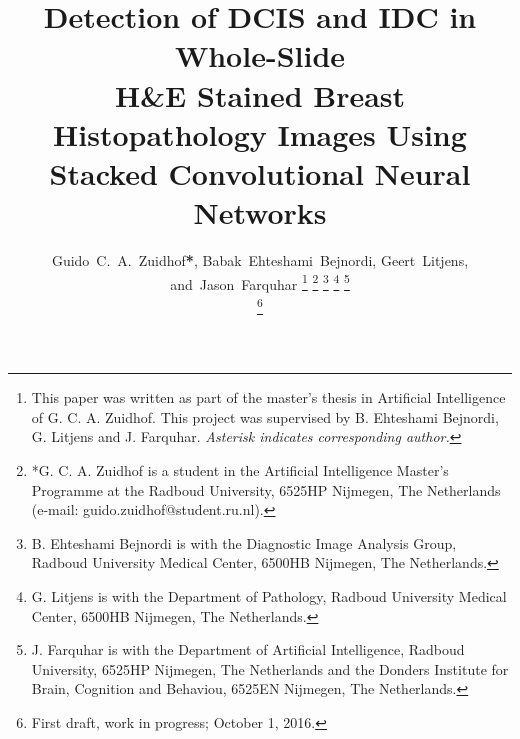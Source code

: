 \documentclass[journal]{IEEEtran}
\begin{document}
%
\title{Detection of DCIS and IDC in Whole-Slide\\ H\&E Stained Breast Histopathology Images Using Stacked Convolutional Neural Networks}
%
%
%

\author{Guido~C.~A.~Zuidhof\textbf{*},
        Babak~Ehteshami~Bejnordi,
        Geert~Litjens,
        and~Jason~Farquhar%
\thanks{This paper was written as part of the master's thesis in Artificial Intelligence of G. C. A. Zuidhof. This project was supervised by B. Ehteshami Bejnordi, G. Litjens and J. Farquhar. \textit{Asterisk indicates corresponding author.}}%
\thanks{*G. C. A. Zuidhof is a student in the Artificial Intelligence Master's Programme at the Radboud University, 6525HP Nijmegen, The Netherlands (e-mail: guido.zuidhof@student.ru.nl).}%
\thanks{B. Ehteshami Bejnordi is with the Diagnostic Image Analysis Group, Radboud University Medical Center, 6500HB Nijmegen, The Netherlands.}%
\thanks{G. Litjens is with the Department of Pathology, Radboud University Medical Center, 6500HB Nijmegen,
The Netherlands.}%
\thanks{J. Farquhar is with the Department of Artificial Intelligence, Radboud University, 6525HP Nijmegen,
The Netherlands and the Donders Institute for Brain, Cognition and Behaviou, 6525EN Nijmegen, The Netherlands.}%

\thanks{First draft, work in progress; October 1, 2016.}}

% 
%
\end{document}
